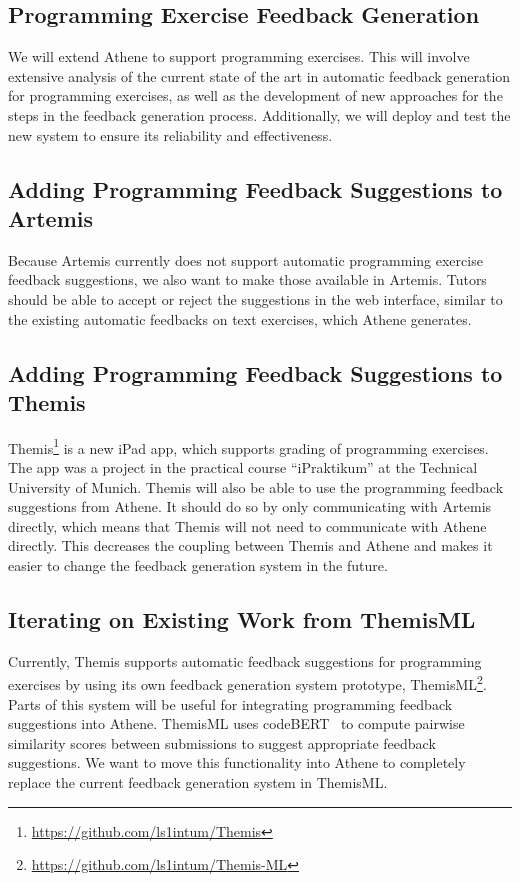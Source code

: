 \subsection*{Programming Exercise Feedback Generation}
We will extend Athene to support programming exercises. This will involve extensive analysis of the current state of the art in automatic feedback generation for programming exercises, as well as the development of new approaches for the steps in the feedback generation process. Additionally, we will deploy and test the new system to ensure its reliability and effectiveness.

\subsection*{Adding Programming Feedback Suggestions to Artemis}
Because Artemis currently does not support automatic programming exercise feedback suggestions, we also want to make those available in Artemis. Tutors should be able to accept or reject the suggestions in the web interface, similar to the existing automatic feedbacks on text exercises, which Athene generates. 

\subsection*{Adding Programming Feedback Suggestions to Themis}

Themis\footnote{\url{https://github.com/ls1intum/Themis}} is a new iPad app, which supports grading of programming exercises. The app was a project in the practical course \enquote{iPraktikum} at the Technical University of Munich.
Themis will also be able to use the programming feedback suggestions from Athene. It should do so by only communicating with Artemis directly, which means that Themis will not need to communicate with Athene directly. This decreases the coupling between Themis and Athene and makes it easier to change the feedback generation system in the future.

\subsection*{Iterating on Existing Work from ThemisML}
Currently, Themis supports automatic feedback suggestions for programming exercises by using its own feedback generation system prototype, ThemisML\footnote{\url{https://github.com/ls1intum/Themis-ML}}.
Parts of this system will be useful for integrating programming feedback suggestions into Athene. ThemisML uses codeBERT~\cite{codeBERT} to compute pairwise similarity scores between submissions to suggest appropriate feedback suggestions. We want to move this functionality into Athene to completely replace the current feedback generation system in ThemisML.

